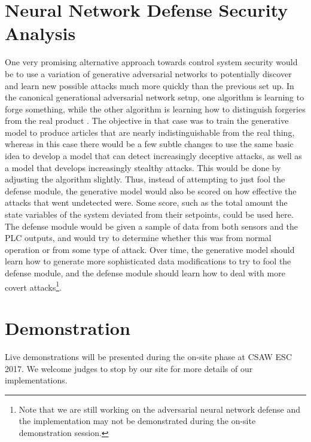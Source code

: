 \documentclass[10pt,twocolumn]{IEEEtran}
\begin{document}
\section{Neural Network Defense Security Analysis}\label{sec:future}
One very promising alternative approach towards control system security would be to use a variation of generative adversarial networks to potentially discover and learn new possible attacks much more quickly than the previous set up.
In the canonical generational adversarial network setup, one algorithm is learning to forge something, while the other algorithm is learning how to distinguish forgeries from the real product \cite{gan}.
The objective in that case was to train the generative model to produce articles that are nearly indistinguishable from the real thing, whereas in this case there would be a few subtle changes to use the same basic idea to develop a model that can detect increasingly deceptive attacks, as well as a model that develops increasingly stealthy attacks.
This would be done by adjusting the algorithm slightly.
Thus, instead of attempting to just fool the defense module, the generative model would also be scored on how effective the attacks that went undetected were.
Some score, such as the total amount the state variables of the system deviated from their setpoints, could be used here.
The defense module would be given a sample of data from both sensors and the PLC outputs, and would try to determine whether this was from normal operation or from some type of attack.
Over time, the generative model should learn how to generate more sophisticated data modifications to try to fool the defense module, and the defense module should learn how to deal with more covert attacks\footnote{Note that we are still working on the adversarial neural network defense and the implementation may not be demonstrated during the on-site demonstration session.}.


\section{Demonstration} \label{sec:conclusion}
Live demonstrations will be presented during the on-site phase at CSAW ESC 2017. We welcome judges to stop by our site for more details of our implementations. 


\vspace{-0.08in}
\raggedright


\end{document}
